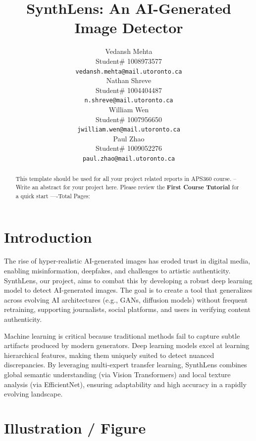 \documentclass{article} %
\title{SynthLens: An AI-Generated Image Detector}
\author{Vedansh Mehta  \\
Student\# 1008973577 \\
\texttt{vedansh.mehta@mail.utoronto.ca} \\
\And
Nathan Shreve  \\
Student\# 1004404487 \\
\texttt{n.shreve@mail.utoronto.ca} \\
\AND
William Wen  \\
Student\# 1007956650 \\
\texttt{jwilliam.wen@mail.utoronto.ca} \\
\And
Paul Zhao \\
Student\# 1009052276 \\
\texttt{paul.zhao@mail.utoronto.ca} \\
\AND
}
\begin{document}
\maketitle

\begin{abstract}
    This template should be used for all your project related reports in APS360 course. -- Write an abstract for your project here. Please review the \textbf{ First Course Tutorial} for a quick start
    ----Total Pages: \pageref{last_page}
\end{abstract}



\section{Introduction}
The rise of hyper-realistic AI-generated images has eroded trust in digital media, enabling misinformation, deepfakes, and challenges to artistic authenticity. SynthLens, our project, aims to combat this by developing a robust deep learning model to detect AI-generated images. The goal is to create a tool that generalizes across evolving AI architectures (e.g., GANs, diffusion models) without frequent retraining, supporting journalists, social platforms, and users in verifying content authenticity.

Machine learning is critical because traditional methods fail to capture subtle artifacts produced by modern generators. Deep learning models excel at learning hierarchical features, making them uniquely suited to detect nuanced discrepancies. By leveraging multi-expert transfer learning, SynthLens combines global semantic understanding (via Vision Transformers) and local texture analysis (via EfficientNet), ensuring adaptability and high accuracy in a rapidly evolving landscape.

\section{Illustration / Figure}
\end{document}
